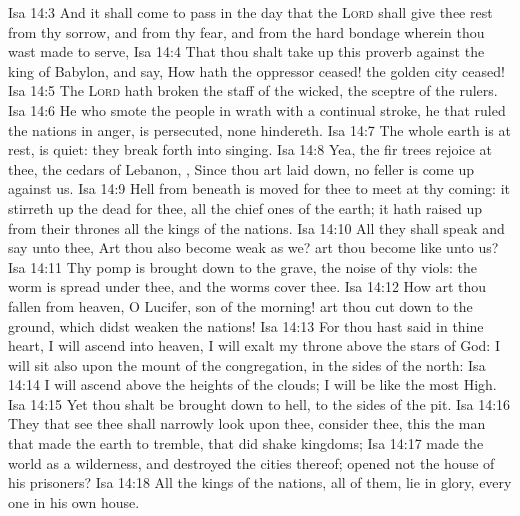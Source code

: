 \vs Isa 14:3 And it shall come to pass in the day that the \textsc{Lord} shall give thee rest from thy sorrow, and from thy fear, and from the hard bondage wherein thou wast made to serve,
\vs Isa 14:4 That thou shalt take up this proverb against the king of Babylon, and say, How hath the oppressor ceased! the golden city ceased!
\vs Isa 14:5 The \textsc{Lord} hath broken the staff of the wicked,  the sceptre of the rulers.
\vs Isa 14:6 He who smote the people in wrath with a continual stroke, he that ruled the nations in anger, is persecuted,  none hindereth.
\vs Isa 14:7 The whole earth is at rest,  is quiet: they break forth into singing.
\vs Isa 14:8 Yea, the fir trees rejoice at thee,  the cedars of Lebanon, , Since thou art laid down, no feller is come up against us.
\vs Isa 14:9 Hell from beneath is moved for thee to meet  at thy coming: it stirreth up the dead for thee,  all the chief ones of the earth; it hath raised up from their thrones all the kings of the nations.
\vs Isa 14:10 All they shall speak and say unto thee, Art thou also become weak as we? art thou become like unto us?
\vs Isa 14:11 Thy pomp is brought down to the grave,  the noise of thy viols: the worm is spread under thee, and the worms cover thee.
\vs Isa 14:12 How art thou fallen from heaven, O Lucifer, son of the morning!  art thou cut down to the ground, which didst weaken the nations!
\vs Isa 14:13 For thou hast said in thine heart, I will ascend into heaven, I will exalt my throne above the stars of God: I will sit also upon the mount of the congregation, in the sides of the north:
\vs Isa 14:14 I will ascend above the heights of the clouds; I will be like the most High.
\vs Isa 14:15 Yet thou shalt be brought down to hell, to the sides of the pit.
\vs Isa 14:16 They that see thee shall narrowly look upon thee,  consider thee,  this the man that made the earth to tremble, that did shake kingdoms;
\vs Isa 14:17  made the world as a wilderness, and destroyed the cities thereof;  opened not the house of his prisoners?
\vs Isa 14:18 All the kings of the nations,  all of them, lie in glory, every one in his own house.
